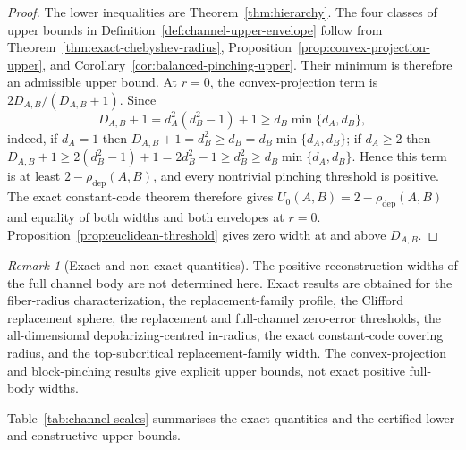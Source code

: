 \documentclass[11pt,a4paper]{article}
\theoremstyle{definition}
\theoremstyle{plain}
\theoremstyle{remark}
\newtheorem{remark}[theorem]{Remark}
\newcommand{\rhodep}{\rho_{\mathrm{dep}}}
\begin{document}
\begin{proof}
The lower inequalities are Theorem~\ref{thm:hierarchy}. The four classes of
upper bounds in Definition~\ref{def:channel-upper-envelope} follow from
Theorem~\ref{thm:exact-chebyshev-radius},
Proposition~\ref{prop:convex-projection-upper}, and
Corollary~\ref{cor:balanced-pinching-upper}. Their minimum is therefore an
admissible upper bound. At $r=0$, the convex-projection term is
$2D_{A,B}/(D_{A,B}+1)$. Since
\[
D_{A,B}+1=d_A^2(d_B^2-1)+1
\geq d_B\min\{d_A,d_B\},
\]
indeed, if $d_A=1$ then $D_{A,B}+1=d_B^2\ge d_B=d_B\min\{d_A,d_B\}$; if $d_A\ge2$ then $D_{A,B}+1\ge2(d_B^2-1)+1=2d_B^2-1\ge d_B^2\ge d_B\min\{d_A,d_B\}$. Hence
this term is at least $2-\rhodep(A,B)$, and every nontrivial pinching
threshold is positive. The exact constant-code theorem therefore gives
$U_0(A,B)=2-\rhodep(A,B)$ and equality of both widths and both envelopes at
$r=0$.
Proposition~\ref{prop:euclidean-threshold} gives zero width at and above
$D_{A,B}$.
\end{proof}


\begin{remark}[Exact and non-exact quantities]
The positive reconstruction widths of the full channel body are not
determined here. Exact results are obtained for the fiber-radius
characterization, the replacement-family profile, the Clifford replacement
sphere, the replacement and full-channel zero-error thresholds, the
all-dimensional depolarizing-centred in-radius, the exact constant-code
covering radius, and the top-subcritical replacement-family width. The
convex-projection and block-pinching results give explicit upper bounds, not
exact positive full-body widths.
\end{remark}

Table~\ref{tab:channel-scales} summarises the exact quantities and the
certified lower and constructive upper bounds.
\end{document}
